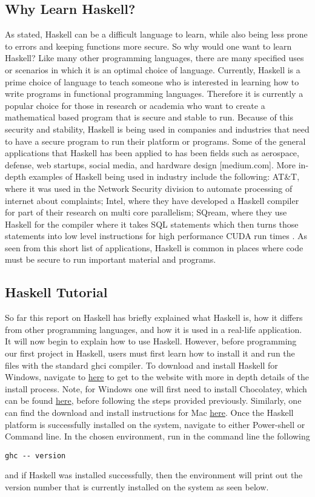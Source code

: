 \documentclass{article}
\begin{document}
\subsection{Why Learn Haskell?}
As stated, Haskell can be a difficult language to learn, while also being less prone to errors and keeping functions more secure.
So why would one want to learn Haskell?
Like many other programming languages, there are many specified uses or scenarios in which it is an optimal choice of language.
Currently, Haskell is a prime choice of language to teach someone who is interested in learning how to write programs in functional programming languages.
Therefore it is currently a popular choice for those in research or academia who want to create a mathematical based program that is secure and stable to run.
Because of this security and stability, Haskell is being used in companies and industries that need to have a secure program to run their platform or programs.
Some of the general applications that Haskell has been applied to has been fields such as aerospace, defense, web startups, social media, and hardware design \cite{3} [medium.com].
More in-depth examples of Haskell being used in industry include the following: AT&T, where it was used in the Network Security division to automate processing of internet about complaints; Intel, where they have developed a Haskell compiler for part of their research on multi core parallelism; SQream, where they use Haskell for the compiler where it takes SQL statements which then turns those statements into low level instructions for high performance CUDA run times \cite{4}.
As seen from this short list of applications, Haskell is common in places where code must be secure to run important material and programs.

\medskip\noindent
\subsection{Haskell Tutorial}
So far this report on Haskell has briefly explained what Haskell is, how it differs from other programming languages, and how it is used in a real-life application.
It will now begin to explain how to use Haskell.
However, before programming our first project in Haskell, users must first learn how to install it and run the files with the standard ghci compiler.
To download and install Haskell for Windows, navigate to  \href{https://www.haskell.org/platform/windows.html}{here} to get to the website with more in depth details of the install process.
Note, for Windows one will first need to install Chocolatey, which can be found \href{https://chocolatey.org/install}{here}, before following the steps provided previously.
Similarly, one can find the download and install instructions for Mac \href{https://docs.haskellstack.org/en/stable/README/}{here}.
Once the Haskell platform is successfully installed on the system,  navigate to either Power-shell or Command line.
In the chosen environment, run in the command line the following
\begin{lstlisting}
ghc -- version
\end{lstlisting}
and if Haskell was installed successfully, then the environment will print out the version number that is currently installed on the system as seen below.
\end{document}
